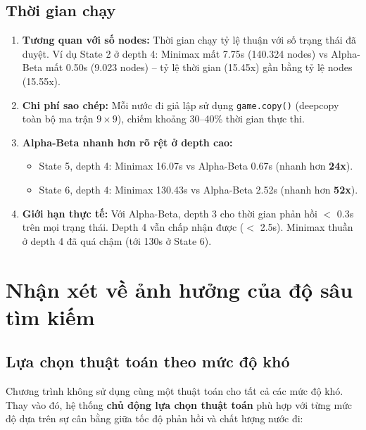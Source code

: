 \documentclass[12pt,a4paper]{article}
\begin{document}
\subsection{Thời gian chạy}

\begin{enumerate}
    \item \textbf{Tương quan với số nodes:} Thời gian chạy tỷ lệ thuận với số trạng thái đã duyệt. Ví dụ State 2 ở depth 4: Minimax mất 7.75s (140.324 nodes) vs Alpha-Beta mất 0.50s (9.023 nodes) -- tỷ lệ thời gian (15.45x) gần bằng tỷ lệ nodes (15.55x).

    \item \textbf{Chi phí sao chép:} Mỗi nước đi giả lập sử dụng \texttt{game.copy()} (deepcopy toàn bộ ma trận $9 \times 9$), chiếm khoảng 30--40\% thời gian thực thi.

    \item \textbf{Alpha-Beta nhanh hơn rõ rệt ở depth cao:}
    \begin{itemize}
        \item State 5, depth 4: Minimax 16.07s vs Alpha-Beta 0.67s (nhanh hơn \textbf{24x}).
        \item State 6, depth 4: Minimax 130.43s vs Alpha-Beta 2.52s (nhanh hơn \textbf{52x}).
    \end{itemize}

    \item \textbf{Giới hạn thực tế:} Với Alpha-Beta, depth 3 cho thời gian phản hồi $<$ 0.3s trên mọi trạng thái. Depth 4 vẫn chấp nhận được ($<$ 2.5s). Minimax thuần ở depth 4 đã quá chậm (tới 130s ở State 6).
\end{enumerate}

\section{Nhận xét về ảnh hưởng của độ sâu tìm kiếm}

\subsection{Lựa chọn thuật toán theo mức độ khó}

Chương trình không sử dụng cùng một thuật toán cho tất cả các mức độ khó. Thay vào đó, hệ thống \textbf{chủ động lựa chọn thuật toán} phù hợp với từng mức độ dựa trên sự cân bằng giữa tốc độ phản hồi và chất lượng nước đi:
\end{document}
